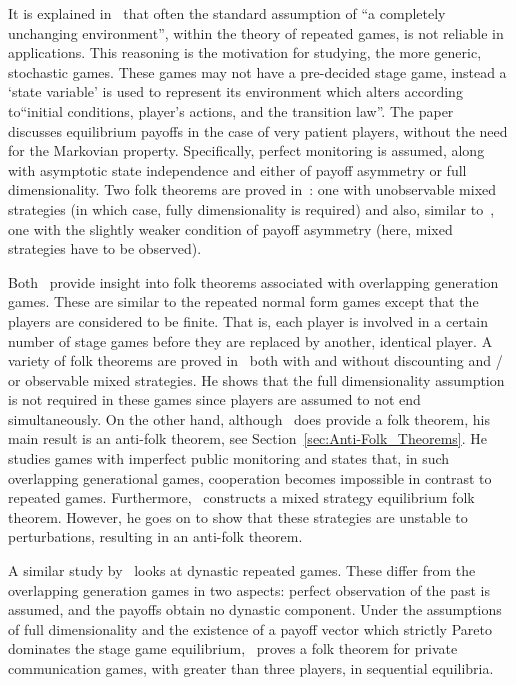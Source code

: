 It is explained in~\cite{Dutta1995} that often the standard assumption of ``a
completely unchanging environment'', within the theory of repeated games, is not
reliable in applications. This reasoning is the motivation for studying, the
more generic, stochastic games. These games may not have a pre-decided stage
game, instead a `state variable' is used to represent its environment which
alters according to``initial conditions, player's actions, and the transition
law''. The paper~\cite{Dutta1995} discusses equilibrium payoffs in the case of
very patient players, without the
need for the Markovian property. Specifically, perfect monitoring is assumed,
along with asymptotic state independence and either of payoff asymmetry or full
dimensionality. Two folk theorems are proved in~\cite{Dutta1995}: one with
unobservable mixed strategies (in which case, fully dimensionality is required)
and also, similar to~\cite{Abreu1994}, one with the slightly weaker condition of
payoff asymmetry (here, mixed strategies have to be observed).

Both~\cite{Bhaskar1998, Gossner1996} provide insight into folk theorems
associated with overlapping generation games. These are similar to the repeated
normal form games except that the players are considered to be finite.
That is, each player is involved in a certain number of stage games before they
are replaced by another, identical player. A variety
of folk theorems are proved in~\cite{Gossner1996} both with and without
discounting and / or observable mixed strategies. He shows that the full
dimensionality assumption is not required in
these games since players are assumed to not end simultaneously. On the other
hand, although~\cite{Bhaskar1998} does provide a folk theorem, his main result
is an anti-folk theorem, see Section~\ref{sec:Anti-Folk_Theorems}. He studies games
with imperfect public monitoring and states that, in such overlapping
generational games, cooperation becomes impossible in contrast to repeated
games. Furthermore,~\cite{Bhaskar1998} constructs a mixed strategy equilibrium
folk theorem. However, he goes on to show that these strategies are unstable to
perturbations, resulting in an anti-folk theorem.

A similar study by~\cite{Anderlini2008} looks at dynastic repeated games. These
differ from the overlapping generation games in two aspects: perfect observation
of the past is assumed, and the payoffs obtain no dynastic component. Under the
assumptions of full dimensionality and the existence of a payoff vector which
strictly Pareto dominates the stage game equilibrium,~\cite{Anderlini2008}
proves a folk theorem for private communication games, with greater than three
players, in sequential equilibria.

